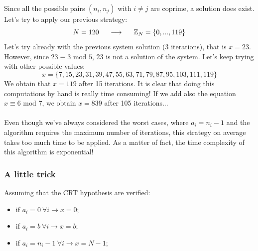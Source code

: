 \documentclass[11pt, a4paper]{article}
\newcommand{\consegue}{\hspace{0.5cm}\longrightarrow\hspace{0.5cm}}
\newcommand{\mymod}{
    \text{ mod }
}
\begin{document}
Since all the possible pairs $(n_i,n_j)$ with $i\ne j$ are coprime, a solution does exist. Let's try to apply our previous strategy:
$$N=120\consegue\mathbb{Z}_N=\{0,...,119\}$$
Let's try already with the previous system solution (3 iterations), that is $x=23$. However, since ${23\equiv3\mymod5}$, 23 is not a solution of the system. Let's keep trying with other possible values:
$$x=\{7,15,23,31,39,47,55,63,71,79,87,95,103,111,119\}$$
We obtain that $x=119$ after 15 iterations. It is clear that doing this computations by hand is really time consuming! If we add also the equation $x\equiv6\mymod7$, we obtain $x=839$ after 105 iterations...\\\\
Even though we've always considered the worst cases, where $a_i=n_i-1$ and the algorithm requires the maximum number of iterations, this strategy on average takes too much time to be applied. As a matter of fact, the time complexity of this algorithm is exponential!

\subsubsection*{A little trick}
Assuming that the CRT hypothesis are verified:
\begin{itemize}
    \item if $a_i=0\ \forall i\rightarrow x=0$;
    \item if $a_i=b\ \forall i\rightarrow x=b$;
    \item if $a_i=n_i-1\ \forall i\rightarrow x=N-1$;
\end{itemize}

\newpage
\end{document}
